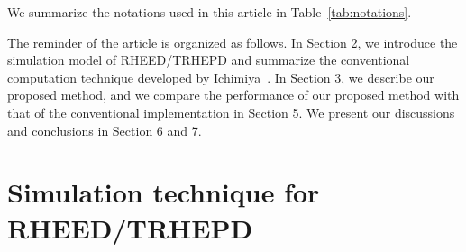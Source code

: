 \documentclass[preprint, 5p, times, sort&compress]{elsarticle}
\begin{document}
        We summarize the notations used in this article in Table~\ref{tab:notations}.

        The reminder of the article is organized as follows.
        In Section 2, we introduce the simulation model of RHEED\slash TRHEPD
        and summarize the conventional computation technique
        developed by Ichimiya~\cite{Ichimiya1983}.
        In Section 3, we describe our proposed method,
        and we compare the performance of our proposed method with that of the conventional implementation in Section 5.
        We present our discussions and conclusions in Section 6 and 7.



        


        \section{Simulation technique for RHEED\slash TRHEPD}
\end{document}
